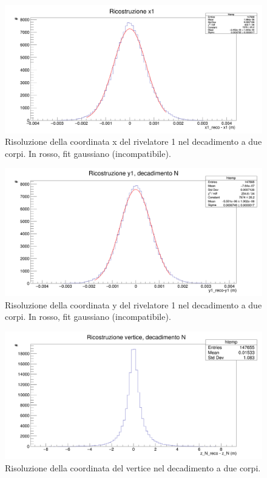 \documentclass[8pt]{extarticle}
\begin{document}
\clearpage

\begin{figure}[!h]
\begin{center}
\includegraphics[scale=0.25]{reco_x1_N}
\caption{Risoluzione della coordinata x del rivelatore 1 nel decadimento a due corpi. In rosso, fit gaussiano (incompatibile).}
\label{fig:reco_x1_N}
\end{center}
\end{figure}

\begin{figure}[!h]
\begin{center}
\includegraphics[scale=0.25]{reco_y1_N}
\caption{Risoluzione della coordinata y del rivelatore 1 nel decadimento a due corpi. In rosso, fit gaussiano (incompatibile).}
\label{fig:reco_y1_N}
\end{center}
\end{figure}

\begin{figure}[!h]
\begin{center}
\includegraphics[scale=0.25]{reco_z_N}
\caption{Risoluzione della coordinata del vertice nel decadimento a due corpi.}
\label{fig:reco_z_N}
\end{center}
\end{figure}
\end{document}
